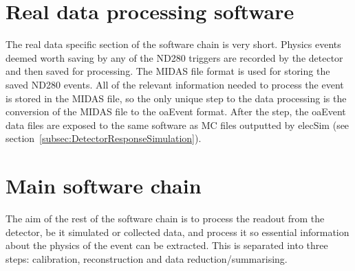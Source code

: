 \section{Real data processing software}
\label{sec:datachain}
The real data specific section of the software chain is very short.  Physics events deemed worth saving by any of the ND280 triggers are recorded by the detector and then saved for processing.  The MIDAS file format is used for storing the saved ND280 events.  All of the relevant information needed to process the event is stored in the MIDAS file, so the only unique step to the data processing is the conversion of the MIDAS file to the oaEvent format.  After the step, the oaEvent data files are exposed to the same software as MC files outputted by elecSim (see section~\ref{subsec:DetectorResponseSimulation}).


\section{Main software chain}
\label{sec:mainchain}
The aim of the rest of the software chain is to process the readout from the detector, be it simulated or collected data, and process it so essential information about the physics of the event can be extracted.  This is separated into three steps: calibration, reconstruction and data reduction/summarising.


